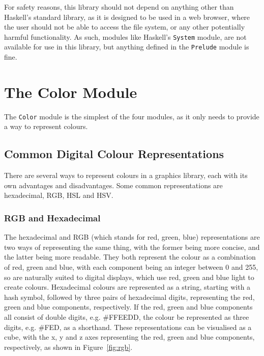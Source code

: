 \documentclass[../main.tex]{subfiles}
\begin{document}
            For safety reasons, this library should not depend on anything other than
                Haskell's standard library, as it is designed to be used in a web browser,
                where the user should not be able to access the file system, or any other
                potentially harmful functionality.
            As such, modules like Haskell's \verb|System| module, are not available for use
                in this library, but anything defined in the \verb|Prelude| module is fine.

    \section{The Color Module}
        The \verb|Color| module is the simplest of the four modules, as it only needs
            to provide a way to represent colours.

        \subsection{Common Digital Colour Representations}
            There are several ways to represent colours in a graphics library, each with
                its own advantages and disadvantages.
            Some common representations are hexadecimal, RGB, HSL and HSV.

            \subsubsection{RGB and Hexadecimal}
                The hexadecimal and RGB (which stands for red, green, blue) representations are
                    two ways of representing the same thing, with the former being more concise,
                    and the latter being more readable.
                They both represent the colour as a combination of red, green and blue, with
                    each component being an integer between 0 and 255, so are naturally suited to
                    digital displays, which use red, green and blue light to create colours.
                Hexadecimal colours are represented as a string, starting with a hash symbol,
                    followed by three pairs of hexadecimal digits, representing the red, green and
                    blue components, respectively.
                If the red, green and blue components all consist of double digits, e.g.
                    \#FFEEDD, the colour be represented as three digits, e.g. \#FED, as a
                    shorthand.
                These representations can be visualised as a cube, with the x, y and z axes
                    representing the red, green and blue components, respectively, as shown in
                    Figure~\ref{fig:rgb}.
\end{document}
